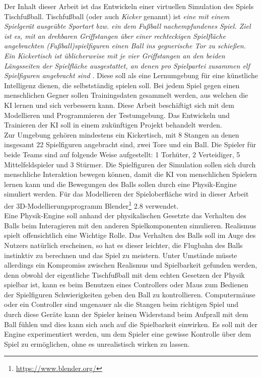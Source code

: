 Der Inhalt dieser Arbeit ist das Entwickeln einer virtuellen Simulation des Spiels Tischfußball. Tischfußball (oder auch \textit{Kicker} genannt) ist \textit{eine mit einem Spielgerät ausgeübte Sportart bzw. ein dem Fußball nachempfundenes Spiel. Ziel ist es, mit an drehbaren Griffstangen über einer rechteckigen Spielfläche angebrachten (Fußball)spielfiguren einen Ball ins gegnerische Tor zu schießen. Ein Kickertisch ist üblicherweise mit je vier Griffstangen an den beiden Längsseiten der Spielfläche ausgestattet, an denen pro Spielpartei zusammen elf Spielfiguren angebracht sind} \citep{Tischkicker}. Diese soll als eine Lernumgebung für eine künstliche Intelligenz dienen, die selbstständig spielen soll. Bei jedem Spiel gegen einen menschlichen Gegner sollen Trainingsdaten gesammelt werden, aus welchen die KI lernen und sich verbessern kann. Diese Arbeit beschäftigt sich mit dem Modellieren und Programmieren der Testumgebung. Das Entwickeln und Trainieren der KI soll in einem zukünftigen Projekt behandelt werden.\\

Zur Umgebung gehören mindestens ein Kickertisch, mit 8 Stangen an denen insgesamt 22 Spielfiguren angebracht sind, zwei Tore und ein Ball. Die Spieler für beide Teams sind auf folgende Weise aufgestellt: 1 Torhüter, 2 Verteidiger, 5 Mittelfeldspieler und 3 Stürmer. Die Spielfiguren der Simulation sollen sich durch menschliche Interaktion bewegen können, damit die KI von menschlichen Spielern lernen kann und die Bewegungen des Balls sollen durch eine Physik-Engine simuliert werden. Für das Modellieren der Spieloberfläche wird in dieser Arbeit der 3D-Modellierungsprogramm Blender\footnote{\url{https://www.blender.org/}} 2.8 verwendet.\\ 

Eine Physik-Engine soll anhand der physikalischen Gesetzte das Verhalten des Balls beim Interagieren mit den anderen Spielkomponenten simulieren. Realismus spielt offensichtlich eine Wichtige Rolle. Das Verhalten des Balls soll im Auge des Nutzers natürlich erscheinen, so hat es dieser leichter, die Flugbahn des Balls instinktiv zu berechnen und das Spiel zu meistern. Unter Umstände müsste allerdings ein Kompromiss zwischen Realismus und Spielbarkeit gefunden werden, denn obwohl der eigentliche Tischfußball mit dem echten Gesetzen der Physik spielbar ist, kann es beim Benutzen eines Controllers oder Maus zum Bedienen der Spielfiguren Schwierigkeiten geben den Ball zu kontrollieren. Computermäuse oder ein Controller sind ungenauer als die Stangen beim richtigen Spiel und durch diese Geräte kann der Spieler keinen Widerstand beim Aufprall mit dem Ball fühlen und dies kann sich auch auf die Spielbarkeit einwirken. Es soll mit der Engine experimentiert werden, um dem Spieler eine gewisse Kontrolle über dem Spiel zu ermöglichen, ohne es unrealistisch wirken zu lassen.\\

